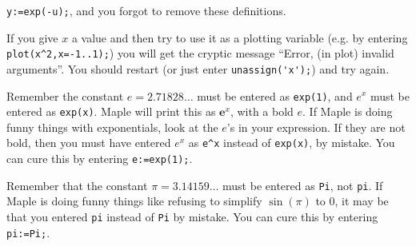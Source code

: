 \documentclass{amsart}
\begin{document}
\begin{secenum}
  \verb~y:=exp(-u);~, and you forgot to remove these
  definitions.  
%
 \item\label{badplotvar} 
  If you give $x$ a value and then try to use it as a
  plotting variable (e.g. by entering
  \verb~plot(x^2,x=-1..1);~) you will get the cryptic message
  ``Error, (in plot) invalid arguments''.  You should
  restart (or just enter \verb~unassign('x');~) and try again. 
%
 \item\label{badexp} Remember the constant $e=2.71828\dots$ must be
  entered as \verb~exp(1)~, and $e^x$ must be entered as
  \verb~exp(x)~.  Maple will print this as $\textbf{e}^x$,
  with a bold $e$.  If Maple is doing funny things with
  exponentials, look at the $e$'s in your expression.  If
  they are not bold, then you must have entered $e^x$ as
  \verb~e^x~ instead of \verb~exp(x)~, by mistake.  You can
  cure this by entering \verb~e:=exp(1);~. 
%
 \item\label{badpiagain} Remember that the constant
  $\pi=3.14159\dots$ must be 
  entered as \verb~Pi~, not \verb~pi~.  If Maple is doing
  funny things like refusing to simplify $\sin(\pi)$ to $0$,
  it may be that you entered \verb~pi~ instead of \verb~Pi~
  by mistake.  You can cure this by entering \verb~pi:=Pi;~. 
\end{secenum}
\end{document}
